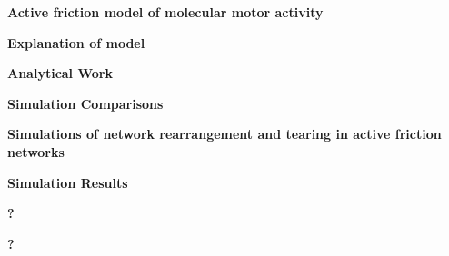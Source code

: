 \documentclass{report}
\begin{document}
\begin{outline}
\begin{outline}
  \end{outline}
  \item {\bf Active friction model of molecular motor activity }
  \begin{outline}
    \item {\bf Explanation of model } \\
    \item {\bf Analytical Work } \\
    \item {\bf Simulation Comparisons} \\
  \end{outline}
  \item {\bf Simulations of network rearrangement and tearing in active friction networks }
  \begin{outline}
    \item {\bf Simulation Results } \\
    \item {\bf  ?} \\
    \item {\bf ?} \\
  \end{outline}
\end{outline}
\end{document}

